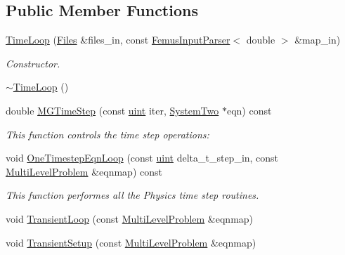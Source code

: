 \subsection*{Public Member Functions}
\begin{DoxyCompactItemize}
\item 
\mbox{\hyperlink{classfemus_1_1_time_loop_aac3f2690b36557508358233b6f8d5811}{Time\+Loop}} (\mbox{\hyperlink{classfemus_1_1_files}{Files}} \&files\+\_\+in, const \mbox{\hyperlink{classfemus_1_1_femus_input_parser}{Femus\+Input\+Parser}}$<$ double $>$ \&map\+\_\+in)
\begin{DoxyCompactList}\small\item\em Constructor. \end{DoxyCompactList}\item 
\mbox{\hyperlink{classfemus_1_1_time_loop_abe6310cd4725d406263319502a7b8300}{$\sim$\+Time\+Loop}} ()
\item 
double \mbox{\hyperlink{classfemus_1_1_time_loop_a3ec24f18fc745fde4e5ac0a2c2da094f}{M\+G\+Time\+Step}} (const \mbox{\hyperlink{_typedefs_8hpp_a91ad9478d81a7aaf2593e8d9c3d06a14}{uint}} iter, \mbox{\hyperlink{classfemus_1_1_system_two}{System\+Two}} $\ast$eqn) const
\begin{DoxyCompactList}\small\item\em This function controls the time step operations\+: \end{DoxyCompactList}\item 
void \mbox{\hyperlink{classfemus_1_1_time_loop_a08750efcce7382813ae3045385b2693f}{One\+Timestep\+Eqn\+Loop}} (const \mbox{\hyperlink{_typedefs_8hpp_a91ad9478d81a7aaf2593e8d9c3d06a14}{uint}} delta\+\_\+t\+\_\+step\+\_\+in, const \mbox{\hyperlink{classfemus_1_1_multi_level_problem}{Multi\+Level\+Problem}} \&eqnmap) const
\begin{DoxyCompactList}\small\item\em This function performes all the Physics time step routines. \end{DoxyCompactList}\item 
void \mbox{\hyperlink{classfemus_1_1_time_loop_ae06941f0786b5a6f7b5311ed5a4ba352}{Transient\+Loop}} (const \mbox{\hyperlink{classfemus_1_1_multi_level_problem}{Multi\+Level\+Problem}} \&eqnmap)
\item 
void \mbox{\hyperlink{classfemus_1_1_time_loop_a53b79d45d92d144d50b640418cf9b36e}{Transient\+Setup}} (const \mbox{\hyperlink{classfemus_1_1_multi_level_problem}{Multi\+Level\+Problem}} \&eqnmap)
\end{DoxyCompactItemize}
